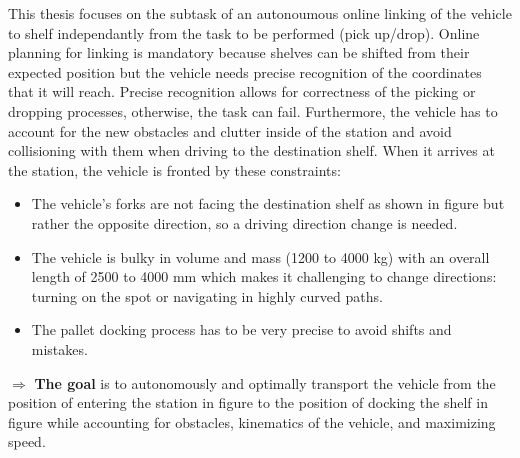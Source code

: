 This thesis focuses on the subtask of an autonoumous online linking of the vehicle to shelf
independantly from the task to be performed (pick up/drop). 
Online planning for linking is mandatory because shelves can be shifted from their expected
position but the vehicle needs precise recognition of the coordinates that it will reach. 
Precise recognition allows for correctness of the picking or dropping processes, otherwise, 
the task can fail. Furthermore, the vehicle has to account for the new obstacles and clutter inside 
of the station and avoid collisioning with them when driving to the destination shelf.
When it arrives at the station, the vehicle is fronted by these constraints:

\begin{itemize}
    \item The vehicle’s forks are not facing the destination shelf as shown in figure  
    but rather the opposite direction, 
    so a driving direction change is needed. 

    \item The vehicle is bulky in volume and mass (1200 to 4000 kg) with an overall 
    length of 2500 to 4000 mm  \cite{R5}
    which makes it challenging  to change directions: turning on the spot or 
    navigating in highly curved paths. 
    
    \item The pallet docking process has to be very precise to avoid shifts and mistakes. 
\end{itemize}

$\Rightarrow$ \textbf{The goal} is to autonomously and optimally transport the vehicle from the position of entering the station in
figure  to the position of docking the shelf in figure  while accounting for obstacles,
kinematics of the vehicle, and maximizing speed. 


